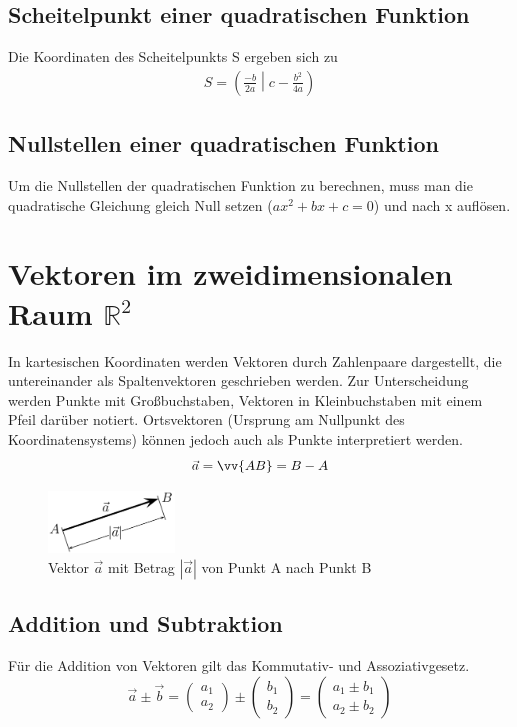 \documentclass[a4paper]{article}
\begin{document}
\subsection{Scheitelpunkt einer quadratischen Funktion}
Die Koordinaten des Scheitelpunkts S ergeben sich zu
\begin{align*}
S=\left( \frac{-b}{2a} \middle| c-\frac{b^{2}}{4a} \right)
\end{align*}
\subsection{Nullstellen einer quadratischen Funktion}
Um die Nullstellen der quadratischen Funktion zu berechnen, muss man die quadratische Gleichung gleich Null setzen ($ax^2 + bx + c = 0$) und nach x auflösen.

\section{Vektoren im zweidimensionalen Raum $\mathbb{R}^2$}
In kartesischen Koordinaten werden Vektoren durch Zahlenpaare dargestellt, die untereinander als Spaltenvektoren geschrieben werden. Zur Unterscheidung werden Punkte mit Großbuchstaben, Vektoren in Kleinbuchstaben mit einem Pfeil darüber notiert. Ortsvektoren (Ursprung am Nullpunkt des Koordinatensystems) können jedoch auch als Punkte interpretiert werden.
\[
\vec{a} = \vv{AB} = B-A
\]
\begin{figure}[H]
\centering
\includegraphics[width=0.3\textwidth]{images/vektor.png}
\caption{\label{fig:vektor}Vektor $\vec a$ mit Betrag $|\vec{a}|$ von Punkt A nach Punkt B}
\end{figure}

\subsection{Addition und Subtraktion}
Für die Addition von Vektoren gilt das Kommutativ- und Assoziativgesetz.
\[
\vec a \pm \vec b=\begin{pmatrix}a_1\\a_2 \end{pmatrix} \pm \begin{pmatrix}b_1\\b_2 \end{pmatrix}=\begin{pmatrix}a_1 \pm b_1\\a_2 \pm b_2 \end{pmatrix} 
\]
\end{document}
